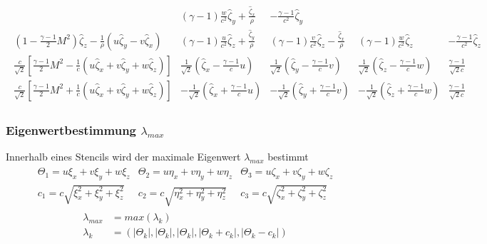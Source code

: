\begin{align*}
\begin{array}{c|c|c|c|c}
&
\left(\gamma-1\right)\frac{w}{c^2}\hat{\zeta}_y+\frac{\hat{\zeta}_x}{\rho}
&
-\frac{\gamma-1}{c^2}\hat{\zeta}_y
\\ \hline
\left(1-\frac{\gamma -1}{2}M^2\right)\hat{\zeta}_z-\frac{1}{\rho}\left(u\hat{\zeta}_y-v\hat{\zeta}_x\right)
&
\left(\gamma-1\right)\frac{u}{c^2}\hat{\zeta}_z+\frac{\hat{\zeta}_y}{\rho}
&
\left(\gamma-1\right)\frac{v}{c^2}\hat{\zeta}_z-\frac{\hat{\zeta}_x}{\rho}
&
\left(\gamma-1\right)\frac{w}{c^2}\hat{\zeta}_z
&
-\frac{\gamma-1}{c^2}\hat{\zeta}_z
\\ \hline
\frac{c}{\sqrt{2}}\left[\frac{\gamma-1}{2}M^2-\frac{1}{c}\left(u\hat{\zeta}_x+v\hat{\zeta}_y+w\hat{\zeta}_z\right)\right]
&
\frac{1}{\sqrt{2}}\left(\hat{\zeta}_x-\frac{\gamma-1}{c}u\right)
&
\frac{1}{\sqrt{2}}\left(\hat{\zeta}_y-\frac{\gamma-1}{c}v\right)
&
\frac{1}{\sqrt{2}}\left(\hat{\zeta}_z-\frac{\gamma-1}{c}w\right)
&
\frac{\gamma-1}{\sqrt{2} c}
\\ \hline
\frac{c}{\sqrt{2}}\left[\frac{\gamma-1}{2}M^2+\frac{1}{c}\left(u\hat{\zeta}_x+v\hat{\zeta}_y+w\hat{\zeta}_z\right)\right]
&
-\frac{1}{\sqrt{2}}\left(\hat{\zeta}_x+\frac{\gamma-1}{c}u\right)
&
-\frac{1}{\sqrt{2}}\left(\hat{\zeta}_y+\frac{\gamma-1}{c}v\right)
&
-\frac{1}{\sqrt{2}}\left(\hat{\zeta}_z+\frac{\gamma-1}{c}w\right)
&
\frac{\gamma-1}{\sqrt{2} c}
\end{array}
\end{align*}


\subsubsection{Eigenwertbestimmung $\lambda_{max}$}
Innerhalb eines Stencils wird der maximale Eigenwert $\lambda_{max}$ bestimmt
\begin{align*}
\begin{matrix}
\Theta_1=u\xi_x+v\xi_y+w\xi_z
&
\Theta_2=u\eta_x+v\eta_y+w\eta_z
&
\Theta_3=u\zeta_x+v\zeta_y+w\zeta_z
\\
c_1=c\sqrt{\xi_x^2+\xi_y^2+\xi_z^2}
&
c_2=c\sqrt{\eta_x^2+\eta_y^2+\eta_z^2}
&
c_3=c\sqrt{\zeta_x^2+\zeta_y^2+\zeta_z^2}
\end{matrix}
\end{align*}
\begin{align*}
 \lambda_{max}&=max\left(\lambda_{k}\right)
\\
\lambda_{k}&=\left(\left|\Theta_k\right|,\left|\Theta_k\right|,\left|\Theta_k\right|,\left|\Theta_k+c_k\right|,\left|\Theta_k-c_k\right| \right)
\end{align*}

